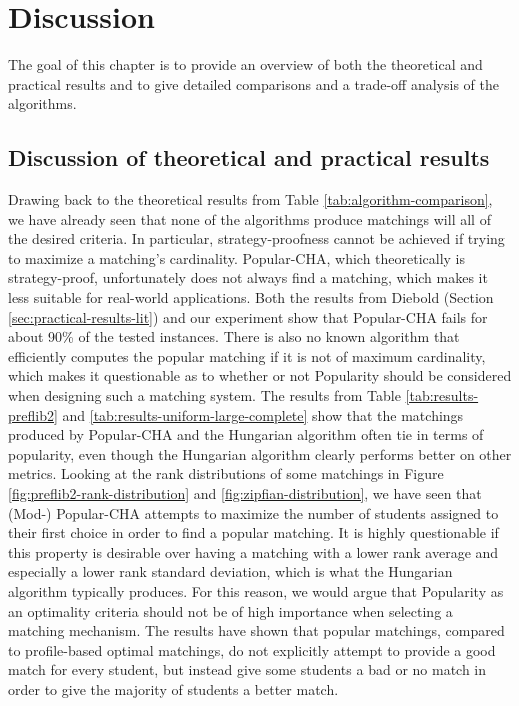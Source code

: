 \section{Discussion}

The goal of this chapter is to provide an overview of both the theoretical and practical results and to give detailed comparisons and a trade-off analysis of the algorithms.

\subsection{Discussion of theoretical and practical results}
Drawing back to the theoretical results from Table \ref{tab:algorithm-comparison}, we have already seen that none of the algorithms produce matchings will all of the desired criteria. In particular, strategy-proofness cannot be achieved if trying to maximize a matching's cardinality. Popular-CHA, which theoretically is strategy-proof, unfortunately does not always find a matching, which makes it less suitable for real-world applications. Both the results from Diebold (Section \ref{sec:practical-results-lit}) and our experiment show that Popular-CHA fails for about 90\% of the tested instances. There is also no known algorithm that efficiently computes the popular matching if it is not of maximum cardinality, which makes it questionable as to whether or not Popularity should be considered when designing such a matching system. The results from Table \ref{tab:results-preflib2} and \ref{tab:results-uniform-large-complete} show that the matchings produced by Popular-CHA and the Hungarian algorithm often tie in terms of popularity, even though the Hungarian algorithm clearly performs better on other metrics. Looking at the rank distributions of some matchings in Figure \ref{fig:preflib2-rank-distribution} and \ref{fig:zipfian-distribution}, we have seen that (Mod-) Popular-CHA attempts to maximize the number of students assigned to their first choice in order to find a popular matching. It is highly questionable if this property is desirable over having a matching with a lower rank average and especially a lower rank standard deviation, which is what the Hungarian algorithm typically produces. For this reason, we would argue that Popularity as an optimality criteria should not be of high importance when selecting a matching mechanism. The results have shown that popular matchings, compared to profile-based optimal matchings, do not explicitly attempt to provide a good match for every student, but instead give some students a bad or no match in order to give the majority of students a better match.

